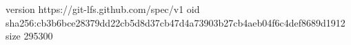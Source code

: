 version https://git-lfs.github.com/spec/v1
oid sha256:cb3b6bce28379dd22cb5d8d37cb47d4a73903b27cb4aeb04f6c4def8689d1912
size 295300
